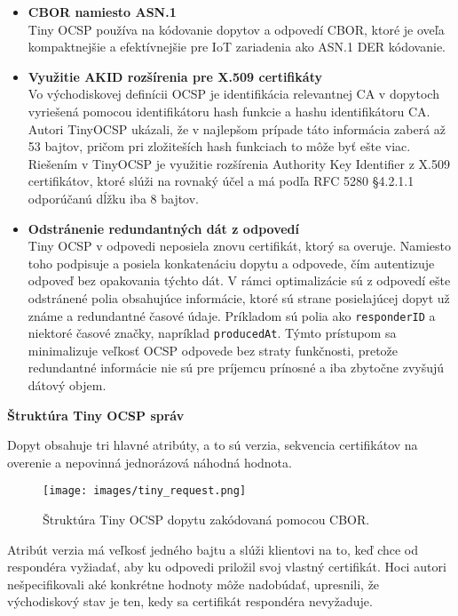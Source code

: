 \documentclass[12pt, twoside]{book}
\newcommand{\subsubsubsection}[1]{%
  \vspace{0.2em}  
  \textbf{#1} \\[0.2em]
  \hspace*{\parindent}
}
\begin{document}
\begin{itemize}
\item \textbf{CBOR namiesto ASN.1}\\
Tiny OCSP používa na kódovanie dopytov a odpovedí CBOR, ktoré je oveľa kompaktnejšie a efektívnejšie pre IoT zariadenia ako ASN.1 DER kódovanie.

\item \textbf{Využitie AKID rozšírenia pre X.509 certifikáty}\\
Vo východiskovej definícii OCSP je identifikácia relevantnej CA v dopytoch vyriešená pomocou identifikátoru hash funkcie a hashu identifikátoru CA. Autori TinyOCSP ukázali, že v najlepšom prípade táto informácia zaberá až 53 bajtov, pričom pri zložiteších hash funkciach to môže byť ešte viac. Riešením v TinyOCSP je využitie rozšírenia Authority Key Identifier z X.509 certifikátov, ktoré slúži na rovnaký účel a má podľa RFC 5280 §4.2.1.1 odporúčanú dĺžku iba 8 bajtov.

\item \textbf{Odstránenie redundantných dát z odpovedí}\\
Tiny OCSP v odpovedi neposiela znovu certifikát, ktorý sa overuje. Namiesto toho podpisuje a posiela konkatenáciu dopytu a odpovede, čím autentizuje odpoveď bez opakovania týchto dát. V rámci optimalizácie sú z odpovedí ešte odstránené polia  obsahujúce informácie, ktoré sú strane posielajúcej dopyt už známe a redundantné časové údaje. Príkladom sú polia ako \texttt{responderID} a niektoré časové značky, napríklad \texttt{producedAt}. Týmto prístupom sa minimalizuje veľkosť OCSP odpovede bez straty funkčnosti, pretože redundantné informácie nie sú pre príjemcu prínosné a iba zbytočne zvyšujú dátový objem.

\end{itemize}

\subsubsubsection{Štruktúra Tiny OCSP správ}
Dopyt obsahuje tri hlavné atribúty, a to sú verzia, sekvencia certifikátov na overenie a nepovinná jednorázová náhodná hodnota. 

\begin{figure}[H]
\centering
\texttt{[image: images/tiny\_request.png]}
\caption{Štruktúra Tiny OCSP dopytu zakódovaná pomocou CBOR.}
\end{figure}

Atribút verzia má veľkosť jedného bajtu a slúži klientovi na to, keď chce od respondéra vyžiadať, aby ku odpovedi priložil svoj vlastný certifikát. Hoci autori nešpecifikovali aké konkrétne hodnoty môže nadobúdať, upresnili, že východiskový stav je ten, kedy sa certifikát respondéra nevyžaduje.
\end{document}
